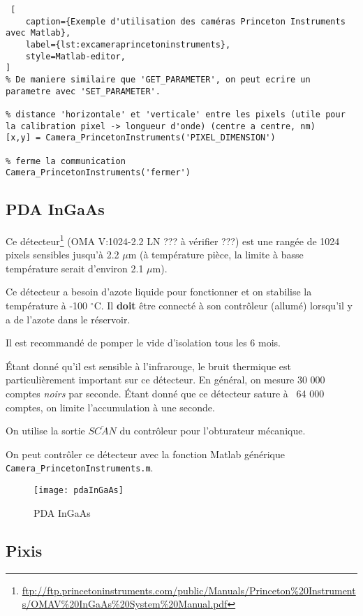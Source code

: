 \documentclass[11pt,francais]{book} %
\begin{document}
\begin{lstlisting} [
    caption={Exemple d'utilisation des caméras Princeton Instruments avec Matlab},
    label={lst:excameraprincetoninstruments},
    style=Matlab-editor,
]
% De maniere similaire que 'GET_PARAMETER', on peut ecrire un parametre avec 'SET_PARAMETER'.

% distance 'horizontale' et 'verticale' entre les pixels (utile pour la calibration pixel -> longueur d'onde) (centre a centre, nm)
[x,y] = Camera_PrincetonInstruments('PIXEL_DIMENSION')

% ferme la communication
Camera_PrincetonInstruments('fermer')

\end{lstlisting}

\subsection{PDA InGaAs}

Ce détecteur\footnote{\url{ftp://ftp.princetoninstruments.com/public/Manuals/Princeton\%20Instruments/OMAV\%20InGaAs\%20System\%20Manual.pdf}} (OMA V:1024-2.2 LN  ??? à vérifier ???) est une rangée de 1024 pixels sensibles jusqu'à 2.2 $\mu$m (à température pièce, la limite à basse température serait d'environ 2.1 $\mu$m).

Ce détecteur a besoin d'azote liquide pour fonctionner et on stabilise la température à -100 $^{\circ}$C.
Il {\bf doit} être connecté à son contrôleur (allumé) lorsqu'il y a de l'azote dans le réservoir.

Il est recommandé de pomper le vide d'isolation tous les 6 mois.

Étant donné qu'il est sensible à l'infrarouge, le bruit thermique est particulièrement important sur ce détecteur.
En général, on mesure 30 000 comptes {\it noirs} par seconde.
Étant donné que ce détecteur sature à ~64 000 comptes, on limite l'accumulation à une seconde.

On utilise la sortie $\overline{SCAN}$ du contrôleur pour l'obturateur mécanique.

On peut contrôler ce détecteur avec la fonction Matlab générique \verb!Camera_PrincetonInstruments.m!.

\begin{figure}[htbp]
  \centering\texttt{[image: pdaInGaAs]}
  \caption{PDA InGaAs}
  \label{fig:pdaingaas}
\end{figure}

\subsection{Pixis}
\end{document}
